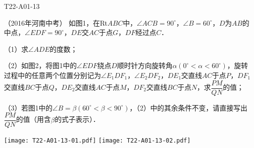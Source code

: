 \begin{defproblem}{T22-A01-13}%
\begin{onlyproblem}%
（2016年河南中考）
如图1，在Rt$ABC$中，$\angle  ACB =90 ^{\circ }$，$\angle  B =60 ^{\circ }$，$D$为$AB$的中点，$\angle  EDF =90 ^{\circ }$，$DE$交$AC$于点$G$，$DF$经过点$C$．

（1）求$\angle  ADE$的度数；

（2）如图2，将图1中的$\angle EDF$绕点$D$顺时针方向旋转角$\alpha (0^{\circ }<\alpha <60^{\circ })$，旋转过程中的任意两个位置分别记为$\angle E_{1}DF_{1}$，$\angle E_{2}DF_{2}$，$DE_{1}$交直线$AC$于点$P$，$DF_{1}$交直线$BC$于点$Q$，$DE_{2}$交直线$AC$于点$M$，$DF_{2}$交直线$BC$于点$N$，求$\dfrac{PM}{QN}$的值；

（3）若图1中的$\angle B=\beta (60^{\circ }<\beta <90^{\circ })$，（2）中的其余条件不变，请直接写出$\dfrac{PM}{QN}$的值（用含$\beta$的式子表示）．

\begin{center}
\texttt{[image: T22-A01-13-01.pdf]}\qquad
\texttt{[image: T22-A01-13-02.pdf]}
\end{center}



\end{onlyproblem}%
\begin{onlysolution}%
\begin{center}
\end{center}
\end{onlysolution}%
\end{defproblem}






